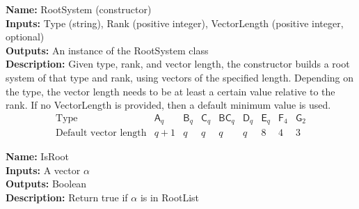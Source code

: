 \documentclass[12pt]{article}
\theoremstyle{definition}
\numberwithin{theorem}{subsection}
\newcommand{\tbf}{\textbf}
\newcommand{\noi}{\noindent}
\begin{document}
\begin{framed}
\noi \tbf{Name:} RootSystem (constructor) \\
\noi \tbf{Inputs:}  Type (string), Rank (positive integer), VectorLength (positive integer, optional) \\
\noi \tbf{Outputs:} An instance of the RootSystem class \\
\noi \tbf{Description:} Given type, rank, and vector length, the constructor builds a root system of that type and rank, using vectors of the specified length. Depending on the type, the vector length needs to be at least a certain value relative to the rank. If no VectorLength is provided, then a default minimum value is used.
\[
	\begin{array}{l|cccccccccc}
		\text{Type} & 
		\mathsf{A}_q & 
		\mathsf{B}_q & 
		\mathsf{C}_q &	
		\mathsf{BC}_q &
		\mathsf{D}_q &
		\mathsf{E}_q &
		\mathsf{F}_4 &
		\mathsf{G}_2 \\
		\hline
		\text{Default vector length} 
		& q+1
		& q 
		& q
		& q 
		& q 
		& 8 
		& 4
		& 3
	\end{array}
\]
\end{framed}

\begin{framed}
\noi \tbf{Name:} IsRoot \\
\noi \tbf{Inputs:} A vector $\alpha$ \\
\noi \tbf{Outputs:} Boolean \\
\noi \tbf{Description:} Return true if $\alpha$ is in RootList
\end{framed}
\end{document}
